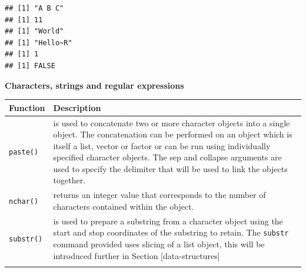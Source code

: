 \documentclass[a4paper]{book}
\begin{document}
\begin{verbatim}
## [1] "A B C"
## [1] 11
## [1] "World"
## [1] "Hello~R"
## [1] 1
## [1] FALSE
\end{verbatim}

\textbf{Characters, strings and regular expressions}

\begin{longtable}[]{@{}ll@{}}
\toprule
\begin{minipage}[b]{0.21\columnwidth}\raggedright\strut
Function\strut
\end{minipage} & \begin{minipage}[b]{0.73\columnwidth}\raggedright\strut
Description\strut
\end{minipage}\tabularnewline
\midrule
\endhead
\begin{minipage}[t]{0.21\columnwidth}\raggedright\strut
\texttt{paste()}\strut
\end{minipage} & \begin{minipage}[t]{0.73\columnwidth}\raggedright\strut
is used to concatenate two or more character objects into a single
object. The concatenation can be performed on an object which is itself
a list, vector or factor or can be run using individually specified
character objects. The sep and collapse arguments are used to specify
the delimiter that will be used to link the objects together.\strut
\end{minipage}\tabularnewline
\begin{minipage}[t]{0.21\columnwidth}\raggedright\strut
\texttt{nchar()}\strut
\end{minipage} & \begin{minipage}[t]{0.73\columnwidth}\raggedright\strut
returns an integer value that corresponds to the number of characters
contained within the object.\strut
\end{minipage}\tabularnewline
\begin{minipage}[t]{0.21\columnwidth}\raggedright\strut
\texttt{substr()}\strut
\end{minipage} & \begin{minipage}[t]{0.73\columnwidth}\raggedright\strut
is used to prepare a substring from a character object using the start
and stop coordinates of the substring to retain. The \texttt{substr}
command provided uses slicing of a list object, this will be introduced
further in Section {[}data-structures{]}\strut
\end{minipage}\tabularnewline
\begin{minipage}[t]{0.21\columnwidth}\raggedright\strut

\end{minipage}
\end{longtable}
\end{document}
